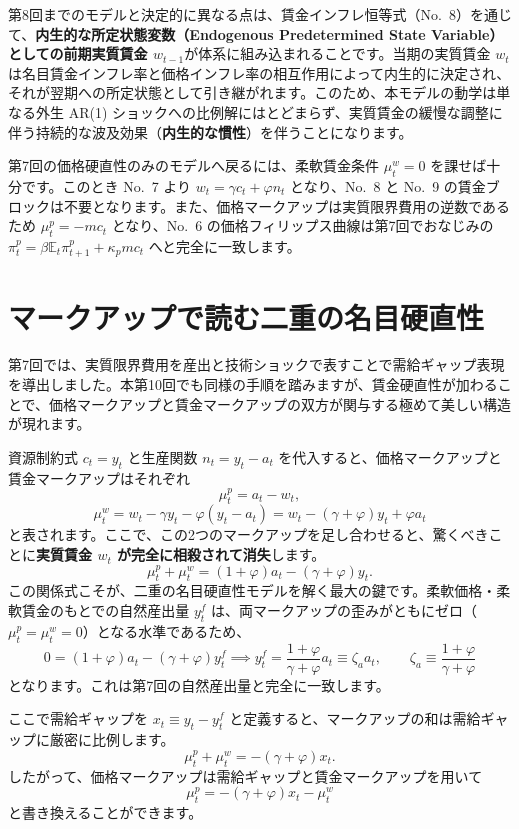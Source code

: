 \documentclass[
  japanese,
  lualatex,
  ja=standard,
  12pt,
  a4paper]{ltjsarticle}
\begin{document}
第8回までのモデルと決定的に異なる点は、賃金インフレ恒等式（No.~8）を通じて、\textbf{内生的な所定状態変数（Endogenous
Predetermined State Variable）としての前期実質賃金
\(w_{t-1}\)}が体系に組み込まれることです。当期の実質賃金 \(w_t\)
は名目賃金インフレ率と価格インフレ率の相互作用によって内生的に決定され、それが翌期への所定状態として引き継がれます。このため、本モデルの動学は単なる外生
AR(1)
ショックへの比例解にはとどまらず、実質賃金の緩慢な調整に伴う持続的な波及効果（\textbf{内生的な慣性}）を伴うことになります。

第7回の価格硬直性のみのモデルへ戻るには、柔軟賃金条件 \(\mu_t^w=0\)
を課せば十分です。このとき No.~7 より \(w_t = \gamma c_t + \varphi n_t\)
となり、No.~8 と No.~9
の賃金ブロックは不要となります。また、価格マークアップは実質限界費用の逆数であるため
\(\mu_t^p = -mc_t\) となり、No.~6
の価格フィリップス曲線は第7回でおなじみの
\(\pi_t^p = \beta\mathbb{E}_t\pi_{t+1}^p + \kappa_p mc_t\)
へと完全に一致します。

\section{マークアップで読む二重の名目硬直性}\label{ux30deux30fcux30afux30a2ux30c3ux30d7ux3067ux8aadux3080ux4e8cux91cdux306eux540dux76eeux786cux76f4ux6027}

第7回では、実質限界費用を産出と技術ショックで表すことで需給ギャップ表現を導出しました。本第10回でも同様の手順を踏みますが、賃金硬直性が加わることで、価格マークアップと賃金マークアップの双方が関与する極めて美しい構造が現れます。

資源制約式 \(c_t=y_t\) と生産関数 \(n_t=y_t-a_t\)
を代入すると、価格マークアップと賃金マークアップはそれぞれ \[
\mu^p_t=a_t-w_t,
\] \[
\mu^w_t
=
w_t-\gamma y_t-\varphi(y_t-a_t)
=
w_t-(\gamma+\varphi)y_t+\varphi a_t
\]
と表されます。ここで、この2つのマークアップを足し合わせると、驚くべきことに\textbf{実質賃金
\(w_t\) が完全に相殺されて消失}します。 \[
\mu^p_t+\mu^w_t
=
(1+\varphi)a_t-(\gamma+\varphi)y_t.
\]
この関係式こそが、二重の名目硬直性モデルを解く最大の鍵です。柔軟価格・柔軟賃金のもとでの自然産出量
\(y_t^f\)
は、両マークアップの歪みがともにゼロ（\(\mu_t^p = \mu_t^w = 0\)）となる水準であるため、
\[
0 = (1+\varphi)a_t-(\gamma+\varphi)y_t^f
\implies
y_t^f = \frac{1+\varphi}{\gamma+\varphi}a_t \equiv \zeta_a a_t,
\qquad
\zeta_a \equiv \frac{1+\varphi}{\gamma+\varphi}
\] となります。これは第7回の自然産出量と完全に一致します。

ここで需給ギャップを \(x_t \equiv y_t - y_t^f\)
と定義すると、マークアップの和は需給ギャップに厳密に比例します。 \[
\mu^p_t+\mu^w_t
=
-(\gamma+\varphi)x_t.
\] したがって、価格マークアップは需給ギャップと賃金マークアップを用いて
\[
\mu^p_t
=
-(\gamma+\varphi)x_t-\mu^w_t
\] と書き換えることができます。
\end{document}
